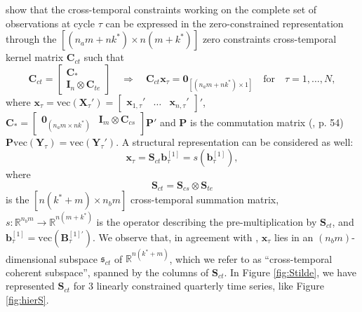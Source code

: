 \documentclass[a4paper,11pt]{article}
\newcommand{\bvet}{\bm{b}}
\newcommand{\xvet}{\bm{x}}
\newcommand{\Bvet}{\bm{B}}
\newcommand{\Cvet}{\bm{C}}
\newcommand{\Ivet}{\bm{I}}
\newcommand{\Pvet}{\bm{P}}
\newcommand{\Svet}{\bm{S}}
\newcommand{\Xvet}{\bm{X}}
\newcommand{\Yvet}{\bm{Y}}
\newcommand{\Zerovet}{\bm{0}}
\theoremstyle{definition}
\begin{document}
\cite{difonzo2023} show that the cross-temporal constraints working on the complete set of observations at cycle $\tau$ can be expressed in the zero-constrained representation through the $\left[(n_am+nk^\ast)\times n(m+k^\ast)\right]$ zero constraints cross-temporal kernel matrix $\Cvet_{ct}$ such that
\begin{equation}
\label{eq:Cct}
	\Cvet_{ct} = \begin{bmatrix}
	\Cvet_\ast\\
	\Ivet_n \otimes \Cvet_{te}
\end{bmatrix} \quad \Longrightarrow \quad
\Cvet_{ct} \xvet_{\tau} = \Zerovet_{[(n_am+nk^\ast)\times1]} \quad \mathrm{for} \quad \tau = 1,\dots,N,
\end{equation}
where
$\xvet_{\tau} = \mathrm{vec}\left(\Xvet_{\tau}'\right) = \begin{bmatrix}
	\xvet_{1, \tau}' &
	\dots &
	\xvet_{n, \tau}'
\end{bmatrix}'$, %
$\Cvet_\ast = \begin{bmatrix}\Zerovet_{(n_a m\times nk^\ast)} & \Ivet_m \otimes \Cvet_{cs}\end{bmatrix}\Pvet'$ and $\Pvet$ is the commutation matrix (\citealp{magnus2019}, p. 54) $\Pvet \mathrm{vec}\left(\Yvet_{\tau}\right) = \mathrm{vec}\left(\Yvet_{\tau}'\right)$. A structural representation can be considered as well:
$$
\xvet_\tau = \Svet_{ct}\bvet^{[1]}_\tau = s\left(\bvet_{\tau}^{[1]}\right),
$$
where
\begin{equation}
	\label{eq:Sct}
	\Svet_{ct} = \Svet_{cs} \otimes \Svet_{te}
\end{equation}
is the $\left[n(k^\ast+m)\times n_b m\right]$ cross-temporal summation matrix, $s: \mathbb{R}^{n_b m} \rightarrow \mathbb{R}^{n(m+k^\ast)}$ is the operator describing the pre-multiplication by $\Svet_{ct}$, and $\bvet^{[1]}_\tau = \mathrm{vec}\left(\Bvet^{[1]\prime}_{\tau}\right)$. We observe that, in agreement with \cite{panagiotelis2021}, $\xvet_{\tau}$ lies in an $(n_b m)$-dimensional subspace $\mathfrak{s}_{ct}$ of $\mathbb{R}^{n(k^\ast+m)}$, which we refer to as “cross-temporal coherent subspace”, spanned by the columns of $\Svet_{ct}$.
In Figure \ref{fig:Stilde}, we have represented $\Svet_{ct}$ for 3 linearly constrained quarterly time series, like Figure \ref{fig:hierS}.

\end{document}
